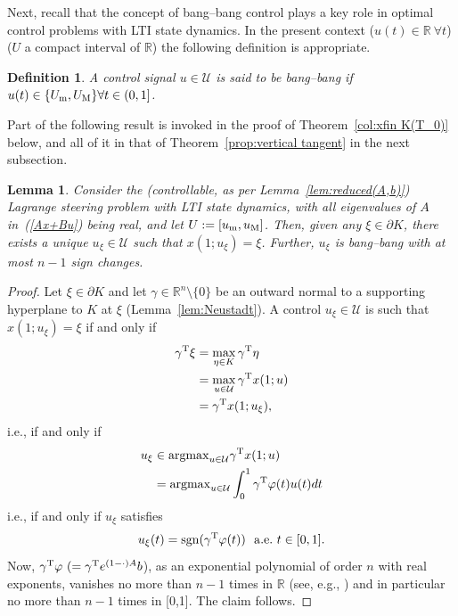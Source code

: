 \documentclass[letterpaper,10pt,conference]{ieeeconf}
\def\R{{\mathbb{R}}}
\newtheorem{lemma}{Lemma} %
\newtheorem{definition}{Definition} %
\begin{document}
Next, recall that the concept of bang--bang control plays a key role in 
optimal control problems with LTI state dynamics.  In the present
context ($u(t)\in\R~\forall t$) ($U$ a compact interval of $\R$) the following
definition is appropriate.
\begin{definition}
A control signal $u\in\mathcal U$ is said to be {\em bang--bang} if
$u(t)\in\{U_{\rm m},U_{\rm M}\}\forall t\in(0,1]$.
\end{definition}
Part of the following result is invoked in the proof of 
Theorem~\ref{col:xfin K(T_0)} below, and all of it in that
of Theorem~\ref{prop:vertical tangent} in the next subsection.
\begin{lemma}
\label{LemmaA}
Consider the (controllable, 
as per Lemma~\ref{lem:reduced(A,b)}) 
Lagrange steering problem with LTI state dynamics, with all
eigenvalues of $A$ in~(\ref{Ax+Bu}) being real, 
and let $U:=[u_{\rm m},u_{\rm M}]$.
Then, given any $\xi\in\partial K$, there exists a unique
$u_{\xi}\in\mathcal U$ such that $x(1;u_{\xi})=\xi$.
Further, $u_{\xi}$ is bang--bang with at most $n-1$ sign changes.
\end{lemma}
\begin{proof}
Let $\xi\in\partial K$ and let
$\gamma\in\R^n\setminus\{0\}$ be an outward normal to a 
supporting hyperplane to $K$ at $\xi$ (Lemma~\ref{lem:Neustadt}).
A control $u_{\xi}\in\mathcal U$
is such that $ x(1;u_{\xi})=\xi$ if and only if
\[
\begin{aligned}
\gamma^{\rm T}\xi&=\max_{\eta\in K}\gamma^{\rm T}\eta\\
&=\max_{u\in\mathcal U}\gamma^{\rm T} x(1;u)\\
&= \gamma^{\rm T} x(1;u_{\xi}),
\end{aligned}
\]
i.e., if and only if
\[
\begin{aligned}
u_{\xi}&\in{\rm argmax}_{u\in\mathcal U} \gamma^{\rm T} x(1;u)\\
&= {\rm argmax}_{u\in\mathcal U} \int_0^1\gamma^{\rm T}\varphi(t)u(t)dt
\end{aligned}
\]
i.e., if and only if $u_{\xi}$ satisfies
\[
u_{\xi}(t) = {\rm sgn}(\gamma^{\rm T}\varphi(t))~~{\rm a.e.~}t\in[0,1].
\]
Now,
$\gamma^{\rm T}\varphi~(=\gamma^{\rm T} e^{(1-\cdot) A} b$),
as an exponential polynomial of order $n$ with real exponents, 
vanishes no more than
$n-1$ times in $\R$ (see, e.g., \cite{AbsilTits2024}) and in particular 
no more than $n-1$ times in [0,1].  The claim follows.
\end{proof}
\end{document}
